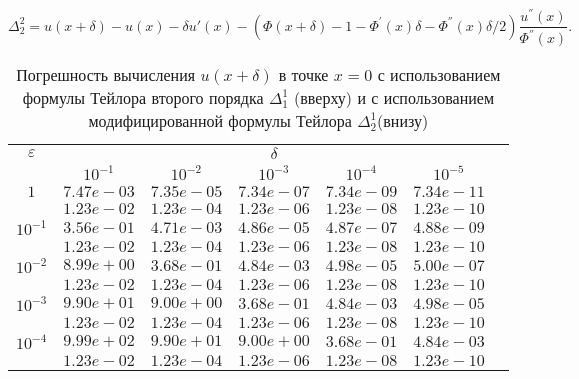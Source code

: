 \documentclass[10pt,twoside]{uz_kgu}
\begin{document}
	$$ \Delta_2^2 = u(x + \delta) - u(x)-\delta u'(x) - (\Phi(x+\delta) - 1 -  \Phi^{'}(x)\delta - \Phi^{''}(x)\delta/2  )\frac{u^{''}(x)}{\Phi^{''}(x)} .$$
	\begin{table} [!htb]
		\caption {Погрешность вычисления $u(x+ \delta)$ в точке $x=0$ с использованием формулы Тейлора второго порядка $\Delta_1^1$ (вверху) и с использованием модифицированной формулы Тейлора $\Delta_2^1$(внизу)}
		\begin{center}
			\begin{tabular}{|c|c|c|c|c|c|c}
				\cline{1-6} $\varepsilon$ & \multicolumn{5}{c|}{$\delta$} \\
				\cline{2-6} &$10^{-1}$ & $10^{-2}$ & $10^{-3}$  & $10^{-4}$& $10^{-5}$\\
				\cline{1-6}
				$1$
				&$7.47e-03$&$7.35e-05$&$7.34e-07$&$7.34e-09$& $7.34e-11$\\
				&$1.23e-02$&$1.23e-04$&$1.23e-06$&$1.23e-08$& $1.23e-10$\\
				\cline{1-6}
				$10^{-1}$
				&$3.56e-01$&$4.71e-03$&$4.86e-05$&$4.87e-07$&$4.88e-09$\\
				&$1.23e-02$&$1.23e-04$&$1.23e-06$&$1.23e-08$&$1.23e-10$\\
				\cline{1-6}
				$10^{-2}$
				&$8.99e+00$&$3.68e-01$&$4.84e-03$&$4.98e-05$&$5.00e-07$\\
				&$1.23e-02$&$1.23e-04$&$1.23e-06$&$1.23e-08$&$1.23e-10$\\
				\cline{1-6}
				$10^{-3}$
				&$9.90e+01$&$9.00e+00$&$3.68e-01$&$4.84e-03$&$4.98e-05$\\
				&$1.23e-02$&$1.23e-04$&$1.23e-06$&$1.23e-08$&$1.23e-10$\\
				\cline{1-6}
				$10^{-4}$
				&$9.99e+02$&$9.90e+01$&$9.00e+00$&$3.68e-01$&$4.84e-03$\\
				&$1.23e-02$&$1.23e-04$&$1.23e-06$&$1.23e-08$&$1.23e-10$\\
				\cline{1-6}
			\end{tabular}
		\end{center}
	\end{table}
	
	
	
	
	
\end{document}
